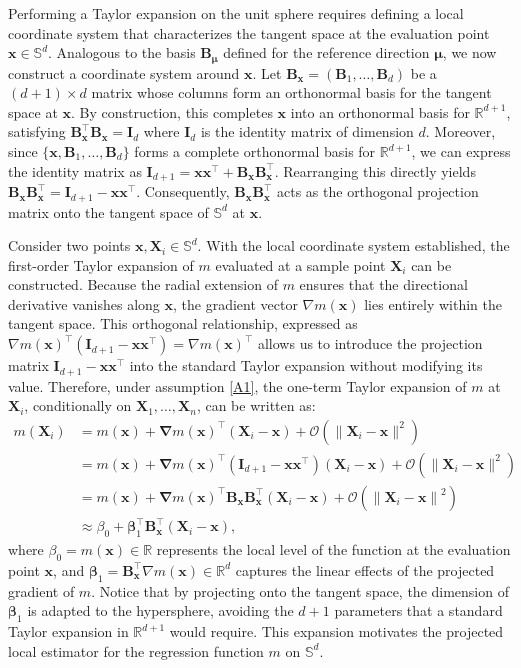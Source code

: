 \documentclass[12pt]{report} %
\newcommand{\bX}{\mathbf{X}}
\newcommand{\bx}{\mathbf{x}}
\newcommand{\bbe}{\boldsymbol{\beta}}
\newcommand{\bnabla}{\boldsymbol\nabla}
\newcommand{\Sd}{\mathbb{S}^{d}}
\newcommand{\bB}{\mathbf{B}}
\begin{document}
Performing a Taylor expansion on the unit sphere requires defining a local coordinate system that characterizes the tangent space at the evaluation point $\bx \in \mathbb{S}^d$. Analogous to the basis $\bB_{\boldsymbol{\mu}}$ defined for the reference direction $\boldsymbol{\mu}$, we now construct a coordinate system around $\bx$. Let $\bB_{\bx} = (\bB_1, \dots, \bB_d)$ be a $(d+1) \times d$ matrix whose columns form an orthonormal basis for the tangent space at $\bx$. By construction, this completes $\bx$ into an orthonormal basis for $\mathbb{R}^{d+1}$, satisfying $\bB_{\bx}^\top \bB_{\bx} = \mathbf{I}_d$ where $\mathbf{I}_d$ is the identity matrix of dimension $d$. Moreover, since $\{\bx, \bB_1, \dots, \bB_d\}$ forms a complete orthonormal basis for $\mathbb{R}^{d+1}$, we can express the identity matrix as $\mathbf{I}_{d+1} = \bx\bx^\top + \bB_{\bx} \bB_{\bx}^\top$. Rearranging this directly yields $\bB_{\bx} \bB_{\bx}^\top = \mathbf{I}_{d+1} - \bx\bx^\top$. Consequently, $\bB_{\bx} \bB_{\bx}^\top$ acts as the orthogonal projection matrix onto the tangent space of $\Sd$ at $\bx$. 

Consider two points $\bx, \bX_i \in \Sd$. With the local coordinate system established, the first-order Taylor expansion of $m$ evaluated at a sample point $\bX_i$ can be constructed. Because the radial extension of $m$ ensures that the directional derivative vanishes along $\bx$, the gradient vector $\nabla m(\bx)$ lies entirely within the tangent space.  This orthogonal relationship, expressed as $\nabla m(\bx)^\top (\mathbf{I}_{d+1} - \bx\bx^\top) = \nabla m(\bx)^\top$ allows us to introduce the projection matrix $\mathbf{I}_{d+1} - \bx\bx^\top$ into the standard Taylor expansion without modifying its value. Therefore, under assumption \ref{A1}, the one-term Taylor expansion of $m$ at $\bX_i$, conditionally on $\bX_1, \ldots, \bX_n$, can be written as:  
\begin{align}
    \label{eq:taylor-sph}
    m(\bX_i) &= m(\bx) + \bnabla m(\bx)^\top(\bX_i - \bx) + \mathcal{O}(\|\bX_i - \bx\|^2) \nonumber\\
    &= m(\bx) + \bnabla m(\bx)^\top (\mathbf{I}_{d+1} - \bx\bx^\top) (\bX_i - \bx) + \mathcal{O}(\|\bX_i - \bx\|^2) \nonumber \\
    & =m(\bx)+\bnabla m(\bx)^\top  \bB_{\bx} \bB_{\bx}^\top \left(\bX_i-\bx\right)+\mathcal{O}\left(\left\|\bX_i-\bx\right\|^2\right) \nonumber\\
    &\approx \beta_0 + \bbe_1^\top \bB_{\bx}^\top (\bX_i - \bx),
\end{align}
where $\beta_0 = m(\bx) \in \mathbb{R}$ represents the local level of the function at the evaluation point $\bx$, and $\bbe_1 = \bB_{\bx}^\top \nabla m(\bx) \in \mathbb{R}^d$ captures the linear effects of the projected gradient of $m$. Notice that by projecting onto the tangent space, the dimension of $\bbe_1$ is adapted to the hypersphere, avoiding the $d+1$ parameters that a standard Taylor expansion in $\mathbb{R}^{d+1}$ would require. This expansion motivates the projected local estimator for the regression function $m$ on $\Sd$.
\end{document}
